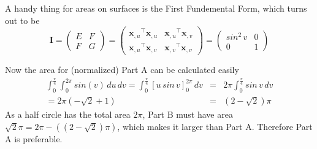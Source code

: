 \documentclass{scrartcl}
\begin{document}
A handy thing for areas on surfaces is the First Fundemental Form, which turns out to be
\begin{equation}
	\mathbf{I} =
	\begin{pmatrix}
		E & F\\
		F & G
	\end{pmatrix}
	=
	\begin{pmatrix}
		{\mathbf{x}_{,u}}^\top{\mathbf{x}_{,u}} & {\mathbf{x}_{,u}}^\top{\mathbf{x}_{,v}}\\
		{\mathbf{x}_{,u}}^\top{\mathbf{x}_{,v}} & {\mathbf{x}_{,v}}^\top{\mathbf{x}_{,v}}
	\end{pmatrix}
	=
	\begin{pmatrix}
		sin^2\,v & 0\\
		0 & 1
	\end{pmatrix}
\end{equation}

Now the area for (normalized) Part A can be calculated easily
\begin{eqnarray}
	\int_0^{\frac{\pi}{4}}\int_0^{2\pi} sin(v) \, du \, dv
	=
	\int_0^{\frac{\pi}{4}}[u\,sin\,v]_0^{2\pi} \, dv
	&=&
	2\pi\int_0^{\frac{\pi}{4}}sin\,v\,dv \\
	=
	2\pi(-\sqrt{2}+1)
	&=&
	(2-\sqrt{2})\pi
\end{eqnarray}
As a half circle has the total area $2\pi$, Part B must have area 
$\sqrt{2}\pi=2\pi-((2-\sqrt{2})\pi)$, which makes it larger than Part A.
Therefore Part A is preferable.

	
\end{document}
